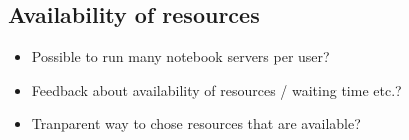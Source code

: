 
\subsection{Availability of resources}
\label{s-availability-resources}

\begin{itemize}
  \item Possible to run many notebook servers per user?
  \item Feedback about availability of resources / waiting time etc.?
  \item Tranparent way to chose resources that are available?
\end{itemize}
